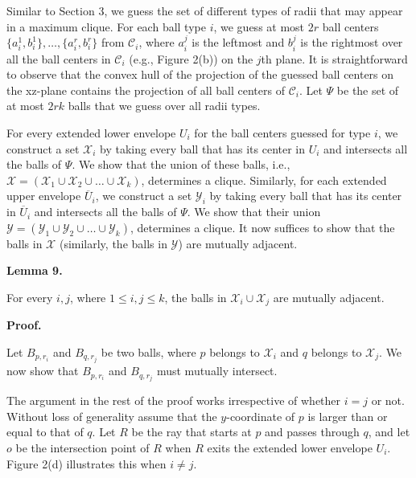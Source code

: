 \documentclass[10pt,a4paper]{amsart}
\begin{document}
\par
\par
Similar to Section 3, we guess the set of different types of radii that may appear in a maximum clique. For each ball type $i$, we guess at most $2r$ ball centers $\{a^{1}_{i},b^{1}_{i}\},\ldots,\{a^{r}_{i},b^{r}_{i}\}$ from $\mathcal{C}_{i}$, where $a^{j}_{i}$ is the leftmost and $b^{j}_{i}$ is the rightmost over all the ball centers in $\mathcal{C}_{i}$ (e.g., Figure 2(b)) on the $j$th plane. It is straightforward to observe that the convex hull of the projection of the guessed ball centers on the xz-plane contains the projection of all ball centers of $\mathcal{C}_{i}$. Let $\Psi$ be the set of at most $2rk$ balls that we guess over all radii types.
\par
\par
For every extended lower envelope $U_{i}$ for the ball centers guessed for type $i$, we construct a set $\mathcal{X}_{i}$ by taking every ball that has its center in $U_{i}$ and intersects all the balls of $\Psi$. We show that the union of these balls, i.e., $\mathcal{X}=(\mathcal{X}_{1}\cup\mathcal{X}_{2}\cup\ldots\cup\mathcal{X}_{k})$, determines a clique. Similarly, for each extended upper envelope $\overline{U}_{i}$, we construct a set $\mathcal{Y}_{i}$ by taking every ball that has its center in $\overline{U}_{i}$ and intersects all the balls of $\Psi$. We show that their union $\mathcal{Y}=(\mathcal{Y}_{1}\cup\mathcal{Y}_{2}\cup\ldots\cup\mathcal{Y}_{k})$, determines a clique. It now suffices to show that the balls in $\mathcal{X}$ (similarly, the balls in $\mathcal{Y}$) are mutually adjacent.
\par
\par
\par\medskip\noindent\textbf{Lemma 9.}\par
For every $i,j$, where $1\leq i,j\leq k$, the balls in $\mathcal{X}_{i}\cup\mathcal{X}_{j}$ are mutually adjacent.
\par
\par
\par
\par
\par\medskip\noindent\textbf{Proof.}\par
Let $B_{p,r_{i}}$ and $B_{q,r_{j}}$ be two balls, where $p$ belongs to $\mathcal{X}_{i}$ and $q$ belongs to $\mathcal{X}_{j}$. We now show that $B_{p,r_{i}}$ and $B_{q,r_{j}}$ must mutually intersect.
\par
\par
The argument in the rest of the proof works irrespective of whether $i=j$ or not. Without loss of generality assume that the $y$-coordinate of $p$ is larger than or equal to that of $q$. Let $R$ be the ray that starts at $p$ and passes through $q$, and let $o$ be the intersection point of $R$ when $R$ exits the extended lower envelope $U_{i}$. Figure 2(d) illustrates this when $i\not=j$.
\end{document}
